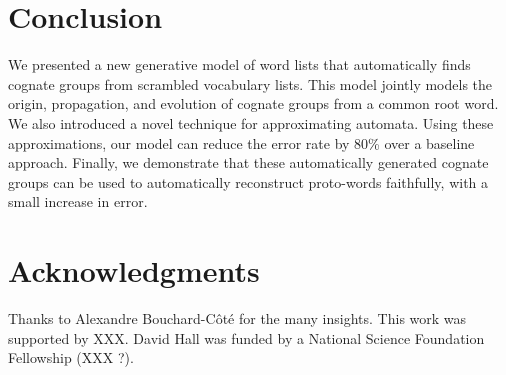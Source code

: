 \documentclass[11pt,a4paper]{article}
\begin{document}
\section{Conclusion}

We presented a new generative model of word lists that automatically
finds cognate groups from scrambled vocabulary lists. This model
jointly models the origin, propagation, and evolution of cognate
groups from a common root word. We also introduced a novel technique
for approximating automata. Using these approximations, our model
can reduce the error rate by 80\% over a baseline approach. Finally,
we demonstrate that these automatically generated cognate groups
can be used to automatically reconstruct proto-words faithfully,
with a small increase in error.

\section*{Acknowledgments}

Thanks to Alexandre Bouchard-C\^ot\'e for the many insights. This work was supported by XXX. David Hall was funded by a National
Science Foundation Fellowship (XXX ?).

\nocite{Yarowsky00inducingmultilingual}


\end{document}
